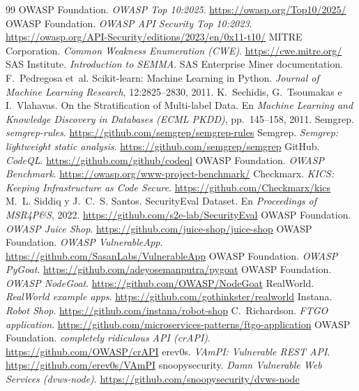 \documentclass[12pt,a4paper]{article}
\begin{document}
\begin{thebibliography}{99}
\small
{} OWASP Foundation. \emph{OWASP Top 10:2025}. \url{https://owasp.org/Top10/2025/}
 OWASP Foundation. \emph{OWASP API Security Top 10:2023}. \url{https://owasp.org/API-Security/editions/2023/en/0x11-t10/}
 MITRE Corporation. \emph{Common Weakness Enumeration (CWE)}. \url{https://cwe.mitre.org/}
 SAS Institute. \emph{Introduction to SEMMA}. SAS Enterprise Miner documentation.
 F.~Pedregosa et~al. Scikit-learn: Machine Learning in Python. \emph{Journal of Machine Learning Research}, 12:2825--2830, 2011.
 K.~Sechidis, G.~Tsoumakas e I.~Vlahavas. On the Stratification of Multi-label Data. En \emph{Machine Learning and Knowledge Discovery in Databases (ECML PKDD)}, pp.~145--158, 2011.
 Semgrep. \emph{semgrep-rules}. \url{https://github.com/semgrep/semgrep-rules}
 Semgrep. \emph{Semgrep: lightweight static analysis}. \url{https://github.com/semgrep/semgrep}
 GitHub. \emph{CodeQL}. \url{https://github.com/github/codeql}
 OWASP Foundation. \emph{OWASP Benchmark}. \url{https://owasp.org/www-project-benchmark/}
 Checkmarx. \emph{KICS: Keeping Infrastructure as Code Secure}. \url{https://github.com/Checkmarx/kics}
 M.~L. Siddiq y J.~C.~S. Santos. SecurityEval Dataset. En \emph{Proceedings of MSR4P\&S}, 2022. \url{https://github.com/s2e-lab/SecurityEval}
 OWASP Foundation. \emph{OWASP Juice Shop}. \url{https://github.com/juice-shop/juice-shop}
 OWASP Foundation. \emph{OWASP VulnerableApp}. \url{https://github.com/SasanLabs/VulnerableApp}
 OWASP Foundation. \emph{OWASP PyGoat}. \url{https://github.com/adeyosemanputra/pygoat}
 OWASP Foundation. \emph{OWASP NodeGoat}. \url{https://github.com/OWASP/NodeGoat}
 RealWorld. \emph{RealWorld example apps}. \url{https://github.com/gothinkster/realworld}
 Instana. \emph{Robot Shop}. \url{https://github.com/instana/robot-shop}
 C.~Richardson. \emph{FTGO application}. \url{https://github.com/microservices-patterns/ftgo-application}
 OWASP Foundation. \emph{completely ridiculous API (crAPI)}. \url{https://github.com/OWASP/crAPI}
 erev0s. \emph{VAmPI: Vulnerable REST API}. \url{https://github.com/erev0s/VAmPI}
 snoopysecurity. \emph{Damn Vulnerable Web Services (dvws-node)}. \url{https://github.com/snoopysecurity/dvws-node}

\end{thebibliography}
\end{document}
